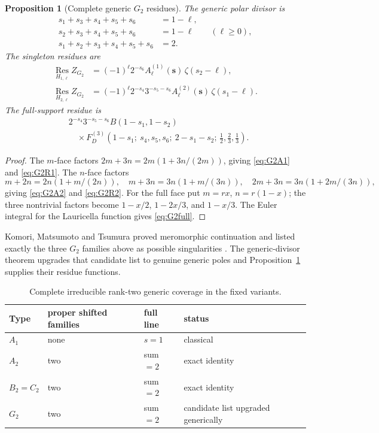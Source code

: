 \documentclass[11pt]{article}
\newtheorem{proposition}[theorem]{Proposition}
\renewcommand{\boxed}[1]{#1}
\newcommand{\Res}{\operatorname*{Res}}
\newcommand{\FD}{F_D}
\begin{document}
\begin{proposition}[Complete generic \(G_2\) residues]\label{prop:G2}
The generic polar divisor is
\begin{align*}
 s_1+s_3+s_4+s_5+s_6&=1-\ell,\\
 s_2+s_3+s_4+s_5+s_6&=1-\ell
 \qquad(\ell\ge0),\\
 s_1+s_2+s_3+s_4+s_5+s_6&=2.
\end{align*}
The singleton residues are
\begin{align}
 \Res_{H_{1,\ell}}Z_{G_2}
 &=(-1)^\ell2^{-s_6}
 A^{(1)}_\ell(\mathbf s)\,\zeta(s_2-\ell),
 \label{eq:G2R1}\\
 \Res_{H_{2,\ell}}Z_{G_2}
 &=(-1)^\ell2^{-s_4}3^{-s_5-s_6}
 A^{(2)}_\ell(\mathbf s)\,\zeta(s_1-\ell).
 \label{eq:G2R2}
\end{align}
The full-support residue is
\begin{equation}\label{eq:G2full}
\boxed{
\begin{aligned}
 &2^{-s_4}3^{-s_5-s_6}B(1-s_1,1-s_2)\\
 &\quad\times
 \FD^{(3)}\!\left(
 1-s_1;\ s_4,s_5,s_6;\ 2-s_1-s_2;\,
 \frac12,\frac23,\frac13\right).
\end{aligned}}
\end{equation}
\end{proposition}

\begin{proof}
The \(m\)-face factors
\(2m+3n=2m(1+3n/(2m))\), giving
\eqref{eq:G2A1} and \eqref{eq:G2R1}.  The \(n\)-face factors
\[
 m+2n=2n(1+m/(2n)),\quad
 m+3n=3n(1+m/(3n)),\quad
 2m+3n=3n(1+2m/(3n)),
\]
giving \eqref{eq:G2A2} and \eqref{eq:G2R2}.
For the full face put \(m=r x\), \(n=r(1-x)\); the three nontrivial
factors become \(1-x/2\), \(1-2x/3\), and \(1-x/3\).
The Euler integral for the Lauricella function gives
\eqref{eq:G2full}.
\end{proof}

Komori, Matsumoto and Tsumura proved meromorphic continuation and
listed exactly the three \(G_2\) families above as possible
singularities \cite{KMT2011G2}.  The generic-divisor theorem upgrades
that candidate list to genuine generic poles and
Proposition~\ref{prop:G2} supplies their residue functions.

\begin{table}[ht]
\centering
\small
\begin{tabular}{@{}llll@{}}
\toprule
Type & proper shifted families & full line & status\\
\midrule
\(A_1\) & none & \(s=1\) & classical\\
\(A_2\) & two & sum \(=2\) & exact identity\\
\(B_2=C_2\) & two & sum \(=2\) & exact identity\\
\(G_2\) & two & sum \(=2\) & candidate list upgraded generically\\
\bottomrule
\end{tabular}
\caption{Complete irreducible rank-two generic coverage in the fixed
variants.}
\label{tab:rank2}
\end{table}
\end{document}
